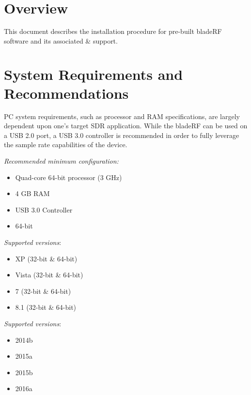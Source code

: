 \section{Overview}
This document describes the \windows installation procedure for pre-built
bladeRF software and its associated \matlab \& \simulink support.

\vspace{0.25in}

\section{System Requirements and Recommendations}

PC system requirements, such as processor and RAM specifications, are
largely dependent upon one's target SDR application. While the bladeRF
can be used on a USB 2.0 port, a USB 3.0 controller is recommended in
order to fully leverage the sample rate capabilities of the device.

\vspace{0.125in}

\textit{Recommended minimum configuration:}
\begin{itemize}
  \item Quad-core 64-bit processor (3 GHz)
  \item 4 GB RAM
  \item USB 3.0 Controller
  \item {} 64-bit
\end{itemize}

\vspace{0.125in}

\textit{Supported \windows versions}:
\begin{itemize}
  \item XP (32-bit \& 64-bit)
  \item Vista (32-bit \& 64-bit)
  \item 7 (32-bit \& 64-bit)
  \item 8.1 (32-bit \& 64-bit)
\end{itemize}

\vspace{0.125in}

\textit{Supported \matlab versions}:
\begin{itemize}
  \item 2014b
  \item 2015a
  \item 2015b
  \item 2016a
\end{itemize}

